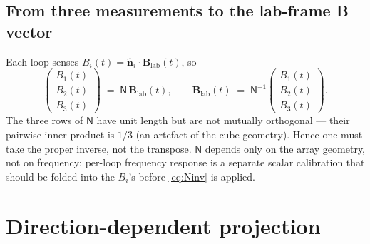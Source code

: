 \documentclass[11pt]{article}
\begin{document}
\subsection*{From three measurements to the lab-frame B vector}

Each loop senses
$B_i(t) = \hat{\mathbf{n}}_i \cdot \mathbf{B}_{\mathrm{lab}}(t)$, so
\begin{equation}
\begin{pmatrix} B_1(t)\\ B_2(t)\\ B_3(t) \end{pmatrix}
\;=\; \mathsf{N}\,\mathbf{B}_{\mathrm{lab}}(t),
\qquad
\mathbf{B}_{\mathrm{lab}}(t) \;=\; \mathsf{N}^{-1}
\begin{pmatrix} B_1(t)\\ B_2(t)\\ B_3(t) \end{pmatrix}.
\label{eq:Ninv}
\end{equation}
The three rows of $\mathsf{N}$ have unit length but are not mutually
orthogonal --- their pairwise inner product is $1/3$ (an artefact of
the cube geometry).  Hence one must take the proper inverse,
not the transpose.  $\mathsf{N}$ depends only on the array geometry,
not on frequency; per-loop frequency response is a separate scalar
calibration that should be folded into the $B_i$'s before \eqref{eq:Ninv}
is applied.

\section{Direction-dependent projection}
\end{document}
